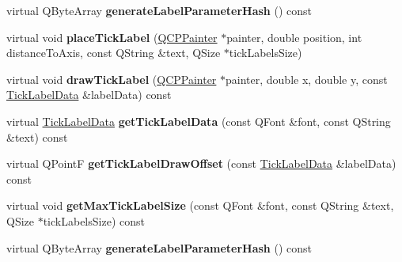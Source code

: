 \begin{DoxyCompactItemize}
\item 
virtual Q\+Byte\+Array {\bfseries generate\+Label\+Parameter\+Hash} () const \hypertarget{class_q_c_p_axis_painter_private_a91a023bbefe1c3bf330570c0b985de84}{}\label{class_q_c_p_axis_painter_private_a91a023bbefe1c3bf330570c0b985de84}

\item 
virtual void {\bfseries place\+Tick\+Label} (\hyperlink{class_q_c_p_painter}{Q\+C\+P\+Painter} $\ast$painter, double position, int distance\+To\+Axis, const Q\+String \&text, Q\+Size $\ast$tick\+Labels\+Size)\hypertarget{class_q_c_p_axis_painter_private_af8fe7350c19575bc33ca770f9b3a15fd}{}\label{class_q_c_p_axis_painter_private_af8fe7350c19575bc33ca770f9b3a15fd}

\item 
virtual void {\bfseries draw\+Tick\+Label} (\hyperlink{class_q_c_p_painter}{Q\+C\+P\+Painter} $\ast$painter, double x, double y, const \hyperlink{struct_q_c_p_axis_painter_private_1_1_tick_label_data}{Tick\+Label\+Data} \&label\+Data) const \hypertarget{class_q_c_p_axis_painter_private_ad8f2f12cd35b8189e8bf96679e873933}{}\label{class_q_c_p_axis_painter_private_ad8f2f12cd35b8189e8bf96679e873933}

\item 
virtual \hyperlink{struct_q_c_p_axis_painter_private_1_1_tick_label_data}{Tick\+Label\+Data} {\bfseries get\+Tick\+Label\+Data} (const Q\+Font \&font, const Q\+String \&text) const \hypertarget{class_q_c_p_axis_painter_private_ad9f24fbcbf9d8c92b34d9d00b010e6a3}{}\label{class_q_c_p_axis_painter_private_ad9f24fbcbf9d8c92b34d9d00b010e6a3}

\item 
virtual Q\+PointF {\bfseries get\+Tick\+Label\+Draw\+Offset} (const \hyperlink{struct_q_c_p_axis_painter_private_1_1_tick_label_data}{Tick\+Label\+Data} \&label\+Data) const \hypertarget{class_q_c_p_axis_painter_private_a6b02e6fd70cc65f726ca8cb3e6f16de4}{}\label{class_q_c_p_axis_painter_private_a6b02e6fd70cc65f726ca8cb3e6f16de4}

\item 
virtual void {\bfseries get\+Max\+Tick\+Label\+Size} (const Q\+Font \&font, const Q\+String \&text, Q\+Size $\ast$tick\+Labels\+Size) const \hypertarget{class_q_c_p_axis_painter_private_a8a7c82303e272485621fde78a5b674f9}{}\label{class_q_c_p_axis_painter_private_a8a7c82303e272485621fde78a5b674f9}

\item 
virtual Q\+Byte\+Array {\bfseries generate\+Label\+Parameter\+Hash} () const \hypertarget{class_q_c_p_axis_painter_private_acbc52f2903ab7c343ec697a1f2a214cf}{}\label{class_q_c_p_axis_painter_private_acbc52f2903ab7c343ec697a1f2a214cf}


\end{DoxyCompactItemize}
